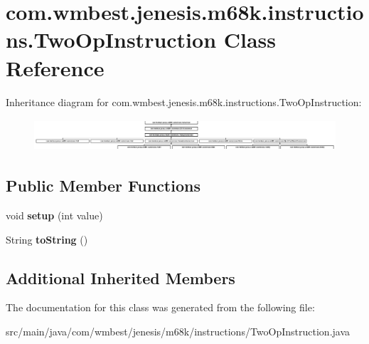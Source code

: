 \hypertarget{classcom_1_1wmbest_1_1jenesis_1_1m68k_1_1instructions_1_1TwoOpInstruction}{\section{com.\-wmbest.\-jenesis.\-m68k.\-instructions.\-Two\-Op\-Instruction Class Reference}
\label{classcom_1_1wmbest_1_1jenesis_1_1m68k_1_1instructions_1_1TwoOpInstruction}
}
Inheritance diagram for com.\-wmbest.\-jenesis.\-m68k.\-instructions.\-Two\-Op\-Instruction\-:\begin{figure}[H]
\begin{center}
\leavevmode
\includegraphics[height=1.193521cm]{classcom_1_1wmbest_1_1jenesis_1_1m68k_1_1instructions_1_1TwoOpInstruction}
\end{center}
\end{figure}
\subsection*{Public Member Functions}
\begin{DoxyCompactItemize}
\item 
\hypertarget{classcom_1_1wmbest_1_1jenesis_1_1m68k_1_1instructions_1_1TwoOpInstruction_a6ca82d1038853e0d8a932481dfd7d495}{void {\bfseries setup} (int value)}\label{classcom_1_1wmbest_1_1jenesis_1_1m68k_1_1instructions_1_1TwoOpInstruction_a6ca82d1038853e0d8a932481dfd7d495}

\item 
\hypertarget{classcom_1_1wmbest_1_1jenesis_1_1m68k_1_1instructions_1_1TwoOpInstruction_af2876d760d248f24d449f800519b3466}{String {\bfseries to\-String} ()}\label{classcom_1_1wmbest_1_1jenesis_1_1m68k_1_1instructions_1_1TwoOpInstruction_af2876d760d248f24d449f800519b3466}

\end{DoxyCompactItemize}
\subsection*{Additional Inherited Members}


The documentation for this class was generated from the following file\-:\begin{DoxyCompactItemize}
\item 
src/main/java/com/wmbest/jenesis/m68k/instructions/Two\-Op\-Instruction.\-java\end{DoxyCompactItemize}
